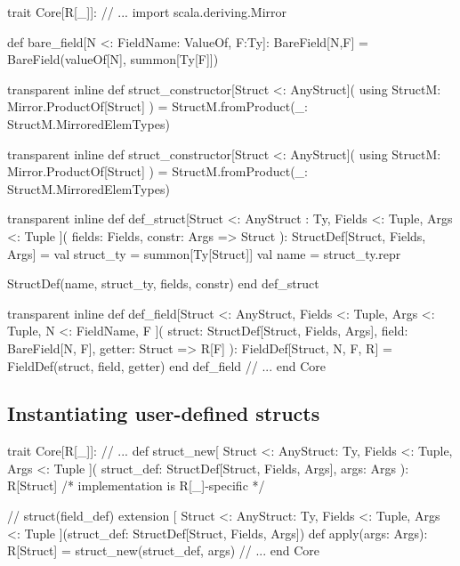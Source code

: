 \documentclass[11pt]{article}
\begin{document}
\begin{ScalaBlockSimple}
trait Core[R[_]]:
  // ...
  import scala.deriving.Mirror
  
  def bare_field[N <: FieldName: ValueOf, F:Ty]: BareField[N,F] =
    BareField(valueOf[N], summon[Ty[F]])
  
  transparent inline def struct_constructor[Struct <: AnyStruct](
    using StructM: Mirror.ProductOf[Struct]
  ) =
    StructM.fromProduct(_: StructM.MirroredElemTypes)
    
  transparent inline def struct_constructor[Struct <: AnyStruct](
    using StructM: Mirror.ProductOf[Struct]
  ) =
    StructM.fromProduct(_: StructM.MirroredElemTypes)
  
  transparent inline def def_struct[Struct <: AnyStruct : Ty,
    Fields <: Tuple, Args <: Tuple
  ](
    fields: Fields,
    constr: Args => Struct
  ): StructDef[Struct, Fields, Args] =
    val struct_ty = summon[Ty[Struct]]
    val name = struct_ty.repr
    
    StructDef(name, struct_ty, fields, constr)
  end def_struct
  
  transparent inline def def_field[Struct <: AnyStruct,
    Fields <: Tuple, Args <: Tuple, N <: FieldName, F
  ](
    struct: StructDef[Struct, Fields, Args],
    field: BareField[N, F],
    getter: Struct => R[F]
  ): FieldDef[Struct, N, F, R] =
    FieldDef(struct, field, getter)
  end def_field
  // ...
end Core
\end{ScalaBlockSimple}

\subsection*{Instantiating user-defined structs}

\begin{ScalaBlockSimple}
trait Core[R[_]]:
  // ...
  def struct_new[
    Struct <: AnyStruct: Ty,
    Fields <: Tuple,
    Args <: Tuple
  ](
    struct_def: StructDef[Struct, Fields, Args],
    args: Args
  ): R[Struct] /* implementation is R[_]-specific */

  // struct(field_def)
  extension [
    Struct <: AnyStruct: Ty,
    Fields <: Tuple,
    Args <: Tuple
  ](struct_def: StructDef[Struct, Fields, Args])
    def apply(args: Args): R[Struct] =
      struct_new(struct_def, args)
  // ...
end Core
\end{ScalaBlockSimple}
\end{document}
